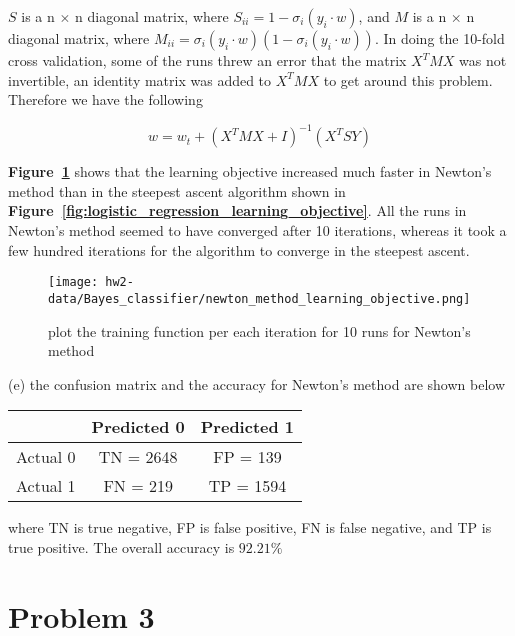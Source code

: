 \documentclass[11pt]{report}
\begin{document}
\-
\justify $S$ is a n $\times$ n diagonal matrix, where $S_{ii} = 1 - \sigma_{i} ({y_{i} \cdot w})$,  and $M$ is a n $\times$ n diagonal matrix, where $M_{ii} = \sigma_{i} ({y_{i} \cdot w})( 1 - \sigma_{i} ({y_{i} \cdot w}))$. In doing the 10-fold cross validation, some of the runs threw an error that the matrix $X^{T} M X$ was not invertible, an identity matrix was added to $X^{T} M X$ to get around this problem. Therefore we have the following

\-

\[
w =  w_{t} + (X^{T} M X + I)^{-1} (X^{T}SY)
\]

\-

\justify \textbf{Figure~\ref{fig:newton_method_learning_objective}} shows that the learning objective increased much faster in Newton's method than in the steepest ascent algorithm shown in \textbf{Figure~\ref{fig:logistic_regression_learning_objective}}. All the runs in Newton's method seemed to have converged after 10 iterations, whereas it took a few hundred iterations for the algorithm to converge in the steepest ascent. 

\begin{figure}[h]
\texttt{[image: hw2-data/Bayes\_classifier/newton\_method\_learning\_objective.png]}
\centering
\caption{plot the training function per each iteration for 10 runs for Newton's method}
\label{fig:newton_method_learning_objective}
\end{figure}

\pagebreak

\justify (e) the confusion matrix and the accuracy for Newton's method are shown below

\begin{center}
\begin{tabular}{ |c|c|c| } 
 \hline
  & Predicted 0  & Predicted 1 \\ 
 \hline
 Actual 0 & TN = 2648 & FP = 139 \\ 
  \hline
Actual 1  & FN = 219 &  TP = 1594 \\ 
 \hline
\end{tabular}
\end{center}
where TN is true negative, FP is false positive, FN is false negative, and TP is true positive. The overall accuracy is \textbf{$92.21\%$}

\pagebreak

\section* {Problem 3}
\end{document}
